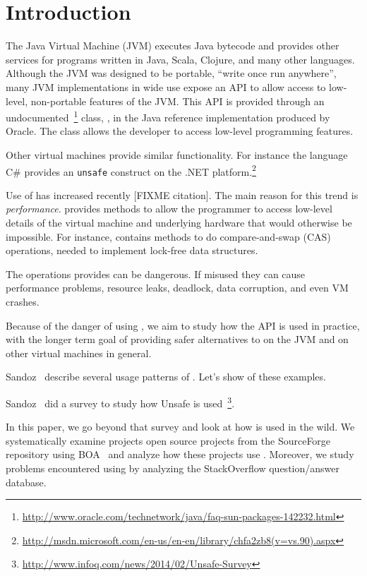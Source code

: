 
\section{Introduction} \label{sec:introduction}

The Java Virtual Machine (JVM) executes Java bytecode and provides other
services for programs written in Java, Scala, Clojure, and many other
languages. Although the JVM was designed to be portable, ``write once run
anywhere'', many JVM implementations in wide use expose an API to allow access
to low-level, non-portable features of the JVM.
This API is provided through an
undocumented~\footnote{\url{http://www.oracle.com/technetwork/java/faq-sun-packages-142232.html}}
class, \smu{}, in the Java reference implementation produced by Oracle.
The class allows the developer to access low-level programming features.

Other virtual machines provide similar functionality. For instance the
language C\# provides an \texttt{unsafe} construct on the .NET
platform.\footnote{\url{http://msdn.microsoft.com/en-us/en-en/library/chfa2zb8(v=vs.90).aspx}}

Use of \smu{} has increased recently [FIXME citation].
The main reason for this trend \smu{} is \emph{performance}.
\smu{} provides methods to allow the programmer to access low-level 
details of the virtual machine and underlying hardware that
would otherwise be impossible.
For instance, \smu{} contains methods to do compare-and-swap (CAS) operations,
needed to implement lock-free data structures.

The operations \smu{} provides can be dangerous. If misused they
can cause 
performance problems, resource leaks, deadlock, data corruption,
and even VM crashes. 

Because of the danger of using \smu{}, we aim to study how the API is used
in practice, with the longer term goal of providing safer
alternatives to \smu{} on the JVM and on other virtual machines in general.

Sandoz~\cite{psandoz14} describe several usage patterns of \smu{}. Let's show of these examples.

Sandoz~\cite{psandoz14} did a survey to study how Unsafe is used~\footnote{\url{http://www.infoq.com/news/2014/02/Unsafe-Survey}}.

In this paper, we go beyond that survey and look at 
how \smu{} is used in the wild. We systematically examine projects open source
projects from the SourceForge repository
using BOA~\cite{Dyer-Nguyen-Rajan-Nguyen-13} and analyze how these
projects use \smu{}.
Moreover, we study problems encountered using \smu{} by analyzing the
StackOverflow question/answer database.


